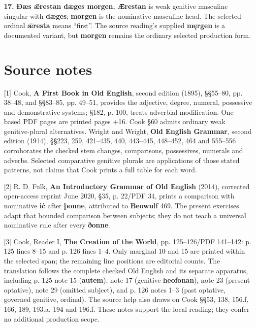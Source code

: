 \par\begin{minipage}{\linewidth}\raggedright
\textbf{17.} \textbf{Ðæs ǣrestan dæges morgen.} \textbf{Ǣrestan} is weak genitive masculine singular with \textbf{dæges}; \textbf{morgen} is the nominative masculine head. The selected ordinal \textbf{ǣresta} means “first”. The source reading’s supplied \textbf{męrgen} is a documented variant, but \textbf{morgen} remains the ordinary selected production form.

\end{minipage}\par\addvspace{4pt}

\clearpage
\section*{Source notes}

\begingroup\fontsize{10}{12.8}\selectfont
[1] Cook, \textbf{A First Book in Old English}, second edition (1895), §§55–80, pp. 38–48, and §§83–85, pp. 49–51, provides the adjective, degree, numeral, possessive and demonstrative systems; §182, p. 100, treats adverbial modification. One-based PDF pages are printed pages +16. Cook §60 admits ordinary weak genitive-plural alternatives. Wright and Wright, \textbf{Old English Grammar}, second edition (1914), §§223, 259, 421–435, 440, 443–445, 448–452, 464 and 555–556 corroborates the checked stem changes, comparisons, possessives, numerals and adverbs. Selected comparative genitive plurals are applications of those stated patterns, not claims that Cook prints a full table for each word.

[2] R. D. Fulk, \textbf{An Introductory Grammar of Old English} (2014), corrected open-access reprint June 2020, §35, p. 22/\allowbreak{}PDF 34, prints a comparison with nominative \textbf{iċ} after \textbf{þonne}, attributed to \textbf{Beowulf} 469. The present exercises adapt that bounded comparison between subjects; they do not teach a universal nominative rule after every \textbf{ðonne}.

[3] Cook, Reader I, \textbf{The Creation of the World}, pp. 125–126/\allowbreak{}PDF 141–142: p. 125 lines 8–15 and p. 126 lines 1–4. Only marginal 10 and 15 are printed within the selected span; the remaining line positions are editorial counts. The translation follows the complete checked Old English and its separate apparatus, including p. 125 note 15 (\textbf{autem}), note 17 (genitive \textbf{heofonan}), note 23 (present optative), note 29 (omitted subject), and p. 126 notes 1–3 (past optative, governed genitive, ordinal). The source help also draws on Cook §§53, 138, 156.f, 166, 189, 193.a, 194 and 196.f. These notes support the local reading; they confer no additional production scope.

\endgroup

